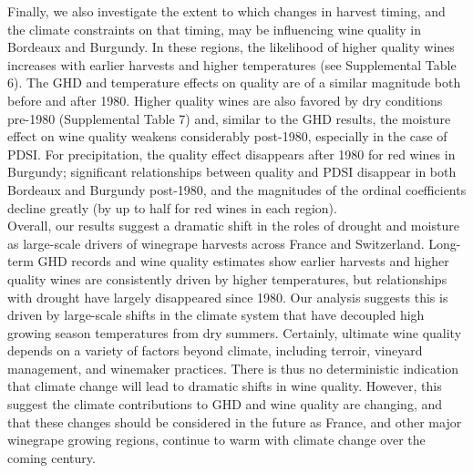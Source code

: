 \documentclass[final]{nature}
\begin{document}
\indent Finally, we also investigate the extent to which changes in harvest timing, and the climate constraints on that timing, may be influencing wine quality in Bordeaux and Burgundy\cite{Broadbent2002}. In these regions, the likelihood of higher quality wines increases with earlier harvests and higher temperatures (see Supplemental Table 6). The GHD and temperature effects on quality are of a similar magnitude both before and after 1980. Higher quality wines are also favored by dry conditions pre-1980 (Supplemental Table 7) and, similar to the GHD results, the moisture effect on wine quality weakens considerably post-1980, especially in the case of PDSI. For precipitation, the quality effect disappears after 1980 for red wines in Burgundy; significant relationships between quality and PDSI disappear in both Bordeaux and Burgundy post-1980, and the magnitudes of the ordinal coefficients decline greatly (by up to half for red wines in each region).\\ %
\indent Overall, our results suggest a dramatic shift in the roles of drought and moisture as large-scale drivers of winegrape harvests across France and Switzerland. Long-term GHD records and wine quality estimates show earlier harvests and higher quality wines are consistently driven by higher temperatures, but relationships with drought have largely disappeared since 1980. Our analysis suggests this is driven by large-scale shifts in the climate system that have decoupled high growing season temperatures from dry summers. Certainly, ultimate wine quality depends on a variety of factors beyond climate, including terroir, vineyard management, and winemaker practices. There is thus no deterministic indication that climate change will lead to dramatic shifts in wine quality. However, this suggest the climate contributions to GHD and wine quality are changing, and that these changes should be considered in the future as France, and other major winegrape growing regions, continue to warm with climate change over the coming century.
\end{document}
